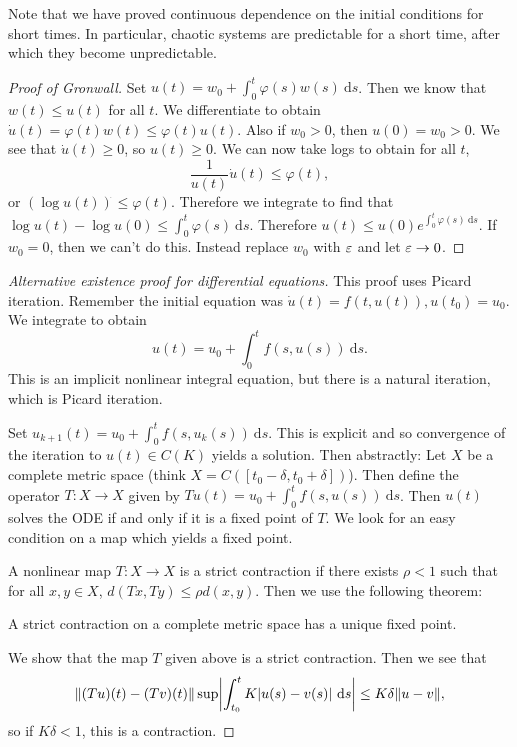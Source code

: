 \documentclass[10pt, twoside]{article}
\renewcommand{\d}{\ \mathrm{d}}
\begin{document}
    Note that we have proved continuous dependence on the initial conditions for short times. In particular, chaotic systems are predictable for a short time, after which they become unpredictable.

    \begin{proof}[Proof of Gronwall]
        Set $u(t) = w_0 + \int_0^t \varphi(s)w(s) \d s$. Then we know that $w(t) \leq u(t)$ for all $t$. We differentiate to obtain $\dot{u}(t) = \varphi(t)w(t) \leq \varphi(t)u(t)$. Also if $w_0 > 0$, then $u(0) = w_0 > 0$. We see that $\dot{u}(t) \geq 0$, so $u(t) \geq 0$. We can now take logs to obtain for all $t$, \[\frac{1}{u(t)} \dot{u}(t) \leq \varphi(t), \] or $(\log u(t))^{\dot{}} \leq \varphi(t)$. Therefore we integrate to find that $\log u(t) - \log u(0) \leq \int_0^t \varphi(s) \d s$. Therefore $u(t) \leq u(0)e^{\int_0^t \varphi(s) \d s}$. If $w_0 = 0$, then we can't do this. Instead replace $w_0$ with $\varepsilon$ and let $\varepsilon \to 0$.
    \end{proof}

    \begin{proof}[Alternative existence proof for differential equations]
        This proof uses Picard iteration. Remember the initial equation was $\dot{u}(t) = f(t,u(t)), u(t_0) = u_0$. We integrate to obtain \[u(t) = u_0 + \int_0^t f(s, u(s)) \d s.\] This is an implicit nonlinear integral equation, but there is a natural iteration, which is Picard iteration.

        Set $u_{k+1}(t) = u_0 + \int_0^t f(s,u_k(s)) \d s$. This is explicit and so convergence of the iteration to $u(t) \in C(K)$ yields a solution. Then abstractly: Let $X$ be a complete metric space (think $X = C([t_0-\delta, t_0+\delta])$). Then define the operator $T:X \to X$ given by $Tu(t) = u_0 + \int_0^t f(s,u(s)) \d s$. Then $u(t)$ solves the ODE if and only if it is a fixed point of $T$. We look for an easy condition on a map which yields a fixed point.

        \begin{defn}
            A nonlinear map $T:X \to X$ is a strict contraction if there exists $\rho < 1$ such that for all $x,y \in X$, $d(Tx,Ty) \leq \rho d(x,y)$. Then we use the following theorem:
        \end{defn}

        \begin{thm}
            A strict contraction on a complete metric space has a unique fixed point.
        \end{thm}

        We show that the map $T$ given above is a strict contraction. Then we see that \[\norm{(Tu)(t) - (Tv)(t)} \sup \abs*{\int_{t_0}^t K \abs{u(s) - v(s)} \d s} \leq K \delta \norm{u-v}, \] so if $K \delta < 1$, this is a contraction.
    \end{proof}
\end{document}
